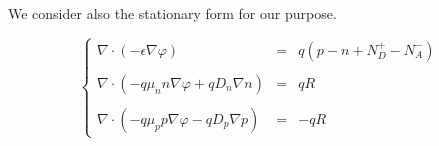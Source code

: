 We consider also the stationary form for our purpose.

\begin{equation}
\left\{
\begin{array}{rcl}
\nabla \cdot (-\epsilon \nabla \varphi) & = & q(p-n+N_D^+-N_A^-) \\ \\
\nabla \cdot ( - q\mu_n n \nabla \varphi + qD_n \nabla n )& = & qR \\ \\
\nabla \cdot (- q\mu_p p \nabla \varphi - qD_p \nabla p )& = & -qR
\end{array}
\right.
\end{equation}